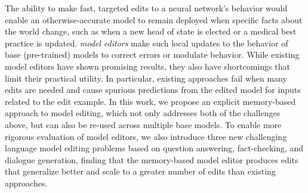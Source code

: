 The ability to make fast, targeted edits to a neural network's behavior would enable an otherwise-accurate model to remain deployed when specific facts about the world change, such as when a new head of state is elected or a medical best practice is updated. 
\textit{model editors} make such local updates to the behavior of base (pre-trained) models to correct errors or modulate behavior. While existing model editors have shown promising results, they also have shortcomings that limit their practical utility. In particular, existing approaches fail when many edits are needed and cause spurious predictions from the edited model for inputs related to the edit example. 
In this work, we propose an explicit memory-based approach to model editing, which not only addresses both of the challenges above, but can also be re-used across multiple base models.
To enable more rigorous evaluation of model editors, we also introduce three new challenging language model editing problems based on question answering, fact-checking, and dialogue generation, finding that the memory-based model editor produces edits that generalize better and scale to a greater number of edits than existing approaches.


